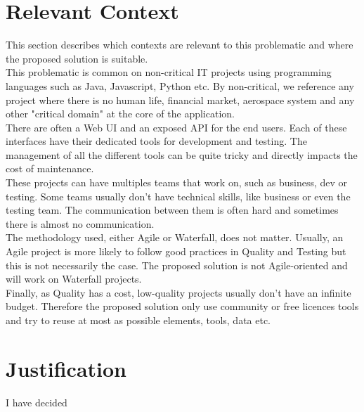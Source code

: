 \section{Relevant Context}\label{sec:relevant-context}
This section describes which contexts are relevant to this problematic and
where the proposed solution is suitable. \\
This problematic is common on non-critical IT projects using
programming languages such as Java, Javascript, Python etc.
By non-critical, we reference any project where there is no human life,
financial market, aerospace system and any other "critical domain" at the
core of the application. \\
There are often a Web UI and an exposed API for the end users.
Each of these interfaces have their dedicated tools for development and
testing.
The management of all the different tools can be quite tricky and directly
impacts the cost of maintenance. \\
These projects can have multiples teams that work on, such as business,
dev or testing.
Some teams usually don't have technical skills, like business or even the
testing team.
The communication between them is often hard and sometimes there is almost
no communication. \\
The methodology used, either Agile or Waterfall, does not matter.
Usually, an Agile project is more likely to follow good practices in
Quality and Testing but this is not necessarily the case.
The proposed solution is not Agile-oriented and will work on Waterfall
projects. \\
Finally, as Quality has a cost, low-quality projects usually don't have an
infinite budget.
Therefore the proposed solution only use community or free licences tools
and try to reuse at most as possible elements, tools, data etc.

\section{Justification}\label{sec:justification}
I have decided
